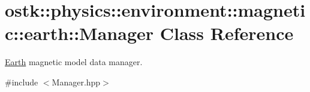 \hypertarget{classostk_1_1physics_1_1environment_1_1magnetic_1_1earth_1_1_manager}{}\section{ostk\+:\+:physics\+:\+:environment\+:\+:magnetic\+:\+:earth\+:\+:Manager Class Reference}
\label{classostk_1_1physics_1_1environment_1_1magnetic_1_1earth_1_1_manager}


\hyperlink{classostk_1_1physics_1_1environment_1_1magnetic_1_1_earth}{Earth} magnetic model data manager.  




{\ttfamily \#include $<$Manager.\+hpp$>$}

